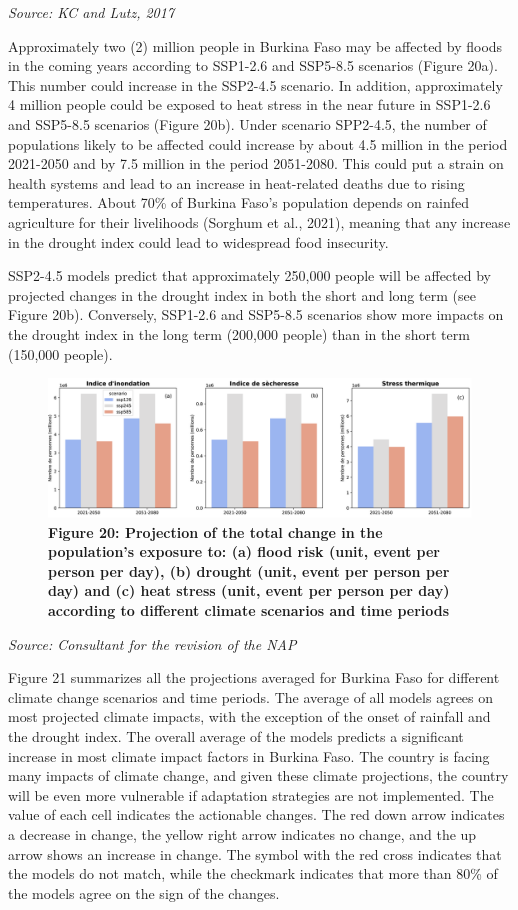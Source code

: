 \documentclass[
]{book}
\begin{document}
\emph{Source: KC and Lutz, 2017}

Approximately two (2) million people in Burkina Faso may be affected by floods in the coming years according to SSP1-2.6 and SSP5-8.5 scenarios (Figure 20a). This number could increase in the SSP2-4.5 scenario. In addition, approximately 4 million people could be exposed to heat stress in the near future in SSP1-2.6 and SSP5-8.5 scenarios (Figure 20b). Under scenario SPP2-4.5, the number of populations likely to be affected could increase by about 4.5 million in the period 2021-2050 and by 7.5 million in the period 2051-2080. This could put a strain on health systems and lead to an increase in heat-related deaths due to rising temperatures. About 70\% of Burkina Faso's population depends on rainfed agriculture for their livelihoods (Sorghum et al., 2021), meaning that any increase in the drought index could lead to widespread food insecurity.

SSP2-4.5 models predict that approximately 250,000 people will be affected by projected changes in the drought index in both the short and long term (see Figure 20b). Conversely, SSP1-2.6 and SSP5-8.5 scenarios show more impacts on the drought index in the long term (200,000 people) than in the short term (150,000 people).

\begin{figure}
\centering
\includegraphics{Figures and Photos/Figure 20.png}
\caption{\textbf{Figure 20: Projection of the total change in the population's exposure to: (a) flood risk (unit, event per person per day), (b) drought (unit, event per person per day) and (c) heat stress (unit, event per person per day) according to different climate scenarios and time periods}}
\end{figure}

\emph{Source: Consultant for the revision of the NAP}

Figure 21 summarizes all the projections averaged for Burkina Faso for different climate change scenarios and time periods. The average of all models agrees on most projected climate impacts, with the exception of the onset of rainfall and the drought index. The overall average of the models predicts a significant increase in most climate impact factors in Burkina Faso. The country is facing many impacts of climate change, and given these climate projections, the country will be even more vulnerable if adaptation strategies are not implemented. The value of each cell indicates the actionable changes. The red down arrow indicates a decrease in change, the yellow right arrow indicates no change, and the up arrow shows an increase in change. The symbol with the red cross indicates that the models do not match, while the checkmark indicates that more than 80\% of the models agree on the sign of the changes.
\end{document}
